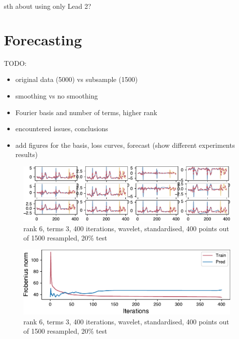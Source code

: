 \documentclass{mldsmsc}
\begin{document}
sth about using only Lead 2?

\section{Forecasting}

TODO:

\begin{itemize}
    \item original data (5000) vs subsample (1500)
    \item smoothing vs no smoothing
    \item Fourier basis and number of terms, higher rank
    \item encountered issues, conclusions
    \item add figures for the basis, loss curves, forecast (show different experiments results)
\end{itemize}

\begin{figure}[H]
\begin{center}
\includegraphics[scale=1]{images/forecast/periodic_fit.pdf}
\caption{rank 6, terms 3, 400 iterations, wavelet, standardised, 400 points out of 1500 resampled, 20\% test}
\label{forecast}
\end{center}
\end{figure}

\begin{figure}[H]
\begin{center}
\includegraphics[scale=1]{images/forecast/periodic_cost.pdf}
\caption{rank 6, terms 3, 400 iterations, wavelet, standardised, 400 points out of 1500 resampled, 20\% test}
\label{loss}
\end{center}
\end{figure}
\end{document}
